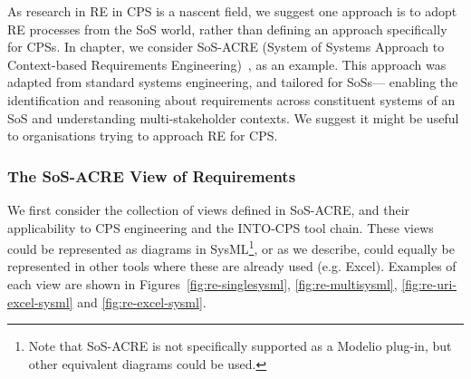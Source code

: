 As research in RE in CPS is a nascent field, we suggest one approach is to adopt RE processes from the SoS world, rather than defining an approach specifically for CPSs.  In chapter, we consider SoS-ACRE (System of Systems Approach to Context-based Requirements Engineering)~\cite{Holt&15}, as an example. This approach was adapted from standard systems engineering, and tailored for SoSs--- enabling the identification and reasoning about requirements across constituent systems of an SoS and understanding multi-stakeholder contexts. We suggest it might be useful to organisations trying to approach RE for CPS.
\subsubsection{The SoS-ACRE View of Requirements}

We first consider the collection of views defined in SoS-ACRE, and their applicability to CPS engineering and the INTO-CPS tool chain. These views could be represented as diagrams in SysML\footnote{Note that SoS-ACRE is not specifically supported as a Modelio plug-in, but other equivalent diagrams could be used.}, or as we describe, could equally be represented in other tools where these are already used (e.g. Excel). Examples of each view are shown in Figures~\ref{fig:re-singlesysml}, \ref{fig:re-multisysml}, \ref{fig:re-uri-excel-sysml} and \ref{fig:re-excel-sysml}. %



